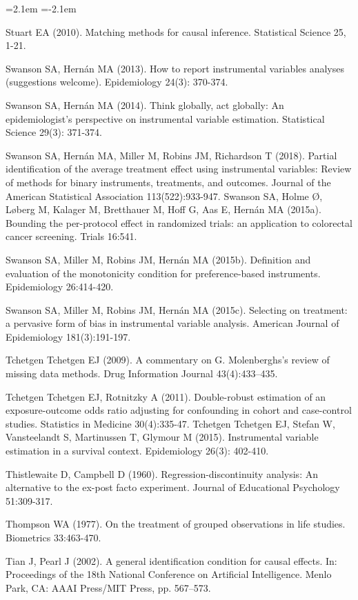 \begin{list}{}{\leftmargin=2.1em   \itemindent=-2.1em \parsep=0pt \itemsep=1.6pt \topsep=4pt \rightmargin=0pt}
\item Stuart EA (2010). Matching methods for causal inference. Statistical Science 25, 1-21.
\item Swanson SA, Hernán MA (2013). How to report instrumental variables analyses (suggestions welcome). Epidemiology 24(3): 370-374.
\item Swanson SA, Hernán MA (2014). Think globally, act globally: An epidemiologist's perspective on instrumental variable estimation. Statistical Science 29(3): 371-374.
\item Swanson SA, Hernán MA, Miller M, Robins JM, Richardson T (2018). Partial identification of the average treatment effect using instrumental variables: Review of methods for binary instruments, treatments, and outcomes. Journal of the American Statistical Association 113(522):933-947. Swanson SA, Holme Ø, Løberg M, Kalager M, Bretthauer M, Hoff G, Aas E, Hernán MA (2015a). Bounding the per-protocol effect in randomized trials: an application to colorectal cancer screening. Trials 16:541.
\item Swanson SA, Miller M, Robins JM, Hernán MA (2015b). Definition and evaluation of the monotonicity condition for preference-based instruments. Epidemiology 26:414-420.
\item Swanson SA, Miller M, Robins JM, Hernán MA (2015c). Selecting on treatment: a pervasive form of bias in instrumental variable analysis. American Journal of Epidemiology 181(3):191-197.
\item Tchetgen Tchetgen EJ (2009). A commentary on G. Molenberghs's review of missing data methods. Drug Information Journal 43(4):433–435.
\item Tchetgen Tchetgen EJ, Rotnitzky A (2011). Double-robust estimation of an exposure-outcome odds ratio adjusting for confounding in cohort and case-control studies. Statistics in Medicine 30(4):335-47. Tchetgen Tchetgen EJ, Stefan W, Vansteelandt S, Martinussen T, Glymour M (2015). Instrumental variable estimation in a survival context. Epidemiology 26(3): 402-410.
\item Thistlewaite D, Campbell D (1960). Regression-discontinuity analysis: An alternative to the ex-post facto experiment. Journal of Educational Psychology 51:309-317.
\item Thompson WA (1977). On the treatment of grouped observations in life studies. Biometrics 33:463-470.
\item Tian J, Pearl J (2002). A general identification condition for causal effects. In: Proceedings of the 18th National Conference on Artificial Intelligence. Menlo Park, CA: AAAI Press/MIT Press, pp. 567–573.

\end{list}

